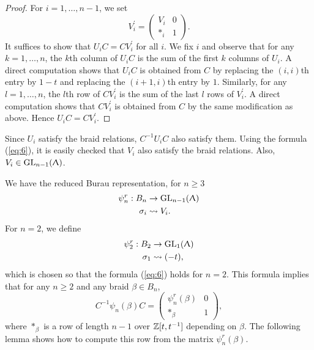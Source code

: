 \begin{proof}
\label{sec:burau-representation-1}
For $i=1, \ldots, n-1$, we set 
\begin{displaymath}
  V_i^{\prime} = \begin{pmatrix} V_i & 0 \\ *_i & 1 \end{pmatrix}.
\end{displaymath}
It suffices to show that $U_iC = CV_i^{\prime}$ for all $i$. We fix $i$ and observe that for any $k= 1, \ldots, n$, the $k$th column of $U_iC$ is the sum of the first $k$ columns of $U_i$. A direct computation shows that $U_iC$ is obtained from $C$ by replacing the $(i, i)$th entry by $1-t$ and replacing the $(i+1, i)$th entry by $1$. Similarly, for any $l = 1, \ldots, n$, the $l$th row of $CV_i^{\prime}$ is the sum of the last $l$ rows of $V_i^{\prime}$. A direct computation shows that $CV_i^{\prime}$ is obtained from $C$ by the same modification as above. Hence $U_iC = CV_i^{\prime}$.
\end{proof}

Since $U_i$ satisfy the braid relations, $C^{-1}U_iC$ also satisfy them. Using the formula (\ref{eq:6}), it is easily checked that $V_i$ also satisfy the braid relations. Also, $V_i \in \text{GL}_{n-1}(\Uplambda)$.

We have the reduced Burau representation, for $n\geq 3$
\begin{align*}
  \psi^r_n: B_n &\to \text{GL}_{n-1}(\Uplambda) \\
  \sigma_i &\rightsquigarrow V_i.
\end{align*}
  For $n=2$, we define 
\begin{align*}
  \psi^r_2 : B_2 &\to \text{GL}_{1}(\Uplambda) \\
  \sigma_1 &\rightsquigarrow (-t),
\end{align*}
which is chosen so that the formula (\ref{eq:6}) holds for $n=2$. This formula implies that for any $n\geq 2$ and any braid $\beta \in B_n$, 
\begin{equation}
\label{eq:5}
C^{-1} \psi_n(\beta) C = \begin{pmatrix} \psi_n^r(\beta) & 0 \\ *_{\beta} & 1 \end{pmatrix},
\end{equation}
where $*_{\beta}$ is a row of length $n-1$ over $\mathbb{Z}[t, t^{-1}]$ depending on $\beta$. The following lemma shows how to compute this row from the matrix $\psi_n^r(\beta)$.

